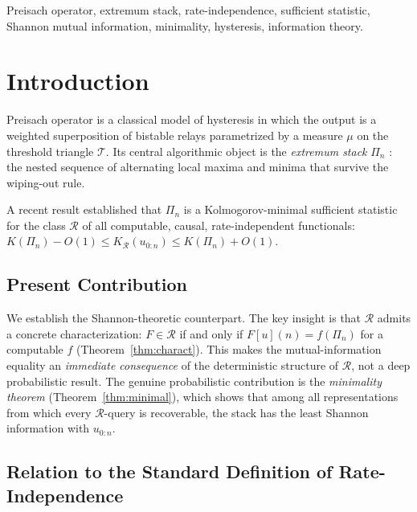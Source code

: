 \documentclass[lettersize,journal]{IEEEtran}
\newcommand{\cR}{\mathcal{R}}
\newcommand{\stack}{\Pi}
\newcommand{\cT}{\mathcal{T}}
\begin{document}
\begin{IEEEkeywords}
Preisach operator, extremum stack, rate-independence,
sufficient statistic, Shannon mutual information, minimality,
hysteresis, information theory.
\end{IEEEkeywords}

\section{Introduction}
\label{sec:intro}

 Preisach operator \cite{Mayergoyz1991} is a
classical model of hysteresis in which the output is a weighted
superposition of bistable relays parametrized by a measure $\mu$
on the threshold triangle $\cT$.
Its central algorithmic object is the \emph{extremum stack}
$\stack_n$ \cite{Frydrych2026IPL}: the nested sequence of alternating
local maxima and minima that survive the wiping-out rule.

A recent result \cite{Frydrych2026IPL} established that $\stack_n$
is a Kolmogorov-minimal sufficient statistic for the class $\cR$ of
all computable, causal, rate-independent functionals:
$K(\stack_n) - O(1) \leq K_{\cR}(u_{0:n}) \leq K(\stack_n)+O(1)$.

\subsection{Present Contribution}

We establish the Shannon-theoretic counterpart.
The key insight is that $\cR$ admits a concrete characterization:
$F \in \cR$ if and only if $F[u](n) = f(\stack_n)$ for a computable
$f$ (Theorem~\ref{thm:charact}).
This makes the mutual-information equality an \emph{immediate
consequence} of the deterministic structure of $\cR$, not a deep
probabilistic result.
The genuine probabilistic contribution is the \emph{minimality
theorem} (Theorem~\ref{thm:minimal}), which shows that among all
representations from which every $\cR$-query is recoverable, the
stack has the least Shannon information with $u_{0:n}$.

\subsection{Relation to the Standard Definition of Rate-Independence}
\end{document}
